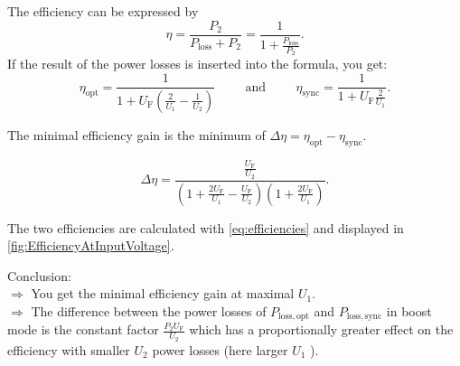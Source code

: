 \begin{solutionblock}
    The efficiency can be expressed by 
    \begin{equation}
        \eta = \frac{P_\mathrm{2}}{P_\mathrm{loss}+P_\mathrm{2}}=\frac{1}{1+\frac{P_\mathrm{loss}}{P_\mathrm{2}}}.
    \end{equation}
    If the result of the power losses is inserted into the formula, you get:
    \begin{equation}
        \eta_\mathrm{opt} = \frac{1}{1+U_\mathrm{F} \left(\frac{2}{U_\mathrm{1}}-\frac{1}{U_\mathrm{2}}\right)}
        \hspace{1cm} \mathrm{and} \hspace{1cm}
        \eta_\mathrm{sync} = \frac{1}{1+U_\mathrm{F} \frac{2}{U_\mathrm{1}}}.
        \label{eq:efficiencies}
    \end{equation}

    The minimal efficiency gain is the minimum of $\Delta \eta=\eta_\mathrm{opt}-\eta_\mathrm{sync}$.
    
    \begin{equation}
        \Delta \eta= \frac{\frac{U_\mathrm{F}}{U_\mathrm{2}}}{\left(1+ \frac{2 U_\mathrm{F}}{U_\mathrm{1}}-\frac{U_\mathrm{F}}{U_\mathrm{2}} \right) \left(1+\frac{2 U_\mathrm{F}}{U_\mathrm{1}}\right)}.
    \end{equation}

    The two efficiencies are calculated with \eqref{eq:efficiencies} and displayed in \autoref{fig:EfficiencyAtInputVoltage}.
    


    Conclusion: \\
    $\Rightarrow$ You get the minimal efficiency gain at maximal $U_\mathrm{1}$. \\
    $\Rightarrow$ The difference between the power losses of $P_\mathrm{loss,opt}$ and $P_\mathrm{loss,sync}$ in boost mode is the constant factor 
    $\frac{P_\mathrm{2} U_\mathrm{F}}{U_\mathrm{2}}$
    which has a proportionally greater effect on the efficiency with smaller $U_\mathrm{2}$ power losses (here larger $U_\mathrm{1}$ ).

\end{solutionblock}

